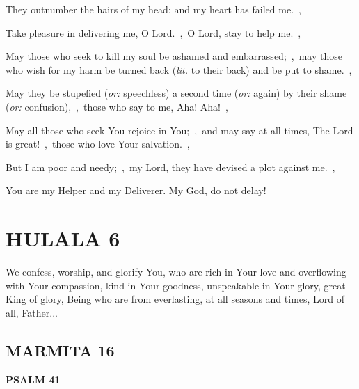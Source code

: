 \documentclass[12pt,twoside,a5paper]{article}
\newcommand{\hulala}[1]{\section*{HULALA {#1}}}
\newcommand{\marmita}[1]{\subsection*{MARMITA {#1}}}
\newcommand{\psalm}[1]{\textbf{PSALM {#1}}\nopagebreak}
\newcommand{\slota}[1]{\liturgicalhint{Slota.} #1}
\newcommand{\translationoption}[1]{\emph{or:} #1}
\newcommand{\translationliteral}[1]{\emph{lit.} #1}
\begin{document}
\begin{normalparskip}
  They outnumber the hairs of my head; and my heart has failed me.~\sep

  Take pleasure in delivering me, O Lord.~\sep\ O Lord, stay to help me.~\sep

  May those who seek to kill my soul be ashamed and embarrassed;~\sep\ may those who wish for my harm be turned back (\translationliteral{to their back}) and be put to shame.~\sep

  May they be stupefied (\translationoption{speechless}) a second time (\translationoption{again}) by their shame (\translationoption{confusion}),~\sep\ those who say to me, Aha! Aha!~\sep

  May all those who seek You rejoice in You;~\sep\ and may say at all times, The Lord is great!~\sep\ those who love Your salvation.~\sep

  But I am poor and needy;~\sep\ my Lord, they have devised a plot against me.~\sep

  You are my Helper and my Deliverer. My God, do not delay!
\end{normalparskip}


\hulala{6}

\slota{We confess, worship, and glorify You, who are rich in Your love and overflowing with Your compassion, kind in Your goodness, unspeakable in Your glory, great King of glory, Being who are from everlasting, at all seasons and times, Lord of all, Father...}

\marmita{16}

\psalm{41}
\end{document}
